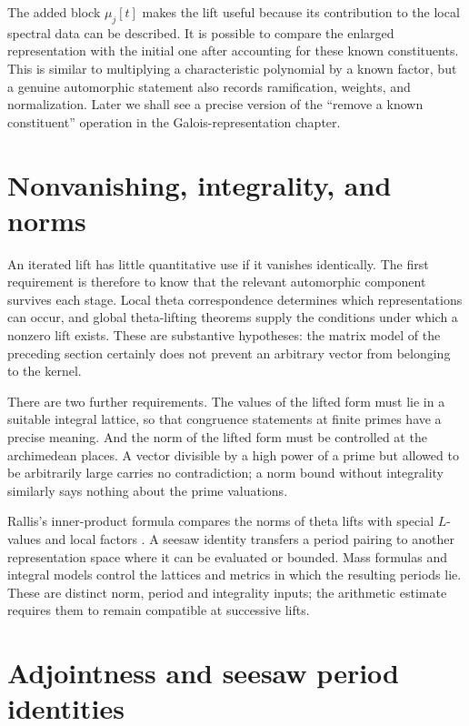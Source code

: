 \documentclass[11pt,openany,oneside]{scrbook}
\theoremstyle{definition}
\theoremstyle{remark}
\begin{document}
The added block $\mu_j[t]$ makes the lift useful because its contribution to the local spectral data can be described. It is possible to compare the enlarged representation with the initial one after accounting for these known constituents. This is similar to multiplying a characteristic polynomial by a known factor, but a genuine automorphic statement also records ramification, weights, and normalization. Later we shall see a precise version of the ``remove a known constituent'' operation in the Galois-representation chapter.

\section{Nonvanishing, integrality, and norms}
An iterated lift has little quantitative use if it vanishes identically. The first requirement is therefore to know that the relevant automorphic component survives each stage. Local theta correspondence determines which representations can occur, and global theta-lifting theorems supply the conditions under which a nonzero lift exists. These are substantive hypotheses: the matrix model of the preceding section certainly does not prevent an arbitrary vector from belonging to the kernel.

There are two further requirements. The values of the lifted form must lie in a suitable integral lattice, so that congruence statements at finite primes have a precise meaning. And the norm of the lifted form must be controlled at the archimedean places. A vector divisible by a high power of a prime but allowed to be arbitrarily large carries no contradiction; a norm bound without integrality similarly says nothing about the prime valuations.

Rallis's inner-product formula compares the norms of theta lifts with special $L$-values and local factors \parencite{GanQiuTakeda2014}. A seesaw identity transfers a period pairing to another representation space where it can be evaluated or bounded. Mass formulas and integral models control the lattices and metrics in which the resulting periods lie. These are distinct norm, period and integrality inputs; the arithmetic estimate requires them to remain compatible at successive lifts.

\section{Adjointness and seesaw period identities}
\end{document}
